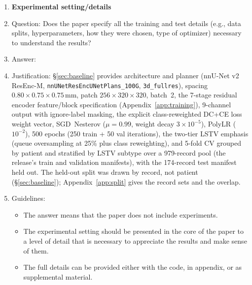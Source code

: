 \begin{enumerate}
\item {\bf Experimental setting/details}
    \item[] Question: Does the paper specify all the training and test details (e.g., data splits, hyperparameters, how they were chosen, type of optimizer) necessary to understand the results?
    \item[] Answer: \answerYes{}
    \item[] Justification: \S\ref{sec:baseline} provides architecture and planner (nnU-Net v2 ResEnc-M, \texttt{nnUNetResEncUNetPlans\_100G}, \texttt{3d\_fullres}), spacing $0.80{\times}0.75{\times}0.75$\,mm, patch $256{\times}320{\times}320$, batch~2, the 7-stage residual encoder feature/block specification (Appendix~\ref{app:training}), 9-channel output with ignore-label masking, the explicit class-reweighted DC+CE loss weight vector, SGD~Nesterov ($\mu{=}0.99$, weight decay $3{\times}10^{-5}$), PolyLR ($10^{-2}$), 500 epochs (250 train + 50 val iterations), the two-tier LSTV emphasis (queue oversampling at 25\% plus class reweighting), and 5-fold CV grouped by patient and stratified by LSTV subtype over a 979-record pool (the release's train and validation manifests), with the 174-record test manifest held out. The held-out split was drawn by record, not patient (\S\ref{sec:baseline}); Appendix~\ref{app:split} gives the record sets and the overlap.
    \item[] Guidelines:
    \begin{itemize}
        \item The answer \answerNA{} means that the paper does not include experiments.
        \item The experimental setting should be presented in the core of the paper to a level of detail that is necessary to appreciate the results and make sense of them.
        \item The full details can be provided either with the code, in appendix, or as supplemental material.
    \end{itemize}


\end{enumerate}
